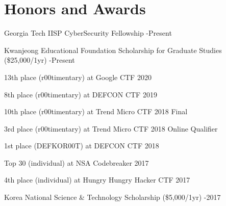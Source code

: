 \section*{Honors and Awards}
\begin{description}
  \item Georgia Tech IISP CyberSecurity Fellowship
  -Present

  \item Kwanjeong Educational Foundation Scholarship for Graduate Studies (\$25,000/1yr) 
  -Present

  \item 13th place (r00timentary) at Google CTF 2020

  \item 8th place (r00timentary) at DEFCON CTF 2019
  
  \item 10th place (r00timentary) at Trend Micro CTF 2018 Final

  \item 3rd place (r00timentary) at Trend Micro CTF 2018 Online Qualifier

  \item 1st place (DEFKOR00T) at DEFCON CTF 2018

  \item Top 30 (individual) at NSA Codebreaker 2017

  \item 4th place (individual) at Hungry Hungry Hacker CTF 2017
  
  \item Korea National Science \& Technology Scholarship (\$5,000/1yr) 
  -2017

\end{description}
